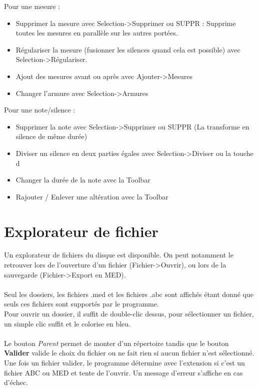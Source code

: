 \documentclass[12pt]{report}
\begin{document}
Pour une mesure : \\
\begin{itemize}
 \item Supprimer la mesure avec Selection->Supprimer ou SUPPR : Supprime toutes les mesures en parallèle sur les autres portées.\\
 \item Régulariser la mesure (fusionner les silences quand cela est possible) avec Selection->Régulariser.\\
 \item Ajout des mesures avant ou après avec Ajouter->Mesures\\
 \item Changer l'armure avec Selection->Armures\\
\end{itemize}
\vskip 0.2in
Pour une note/silence : \\
\begin{itemize}
 \item Supprimer la note avec Selection->Supprimer ou SUPPR (La transforme en silence de même durée)\\
 \item Diviser un silence en deux parties égales avec Selection->Diviser ou la touche d\\
 \item Changer la durée de la note avec la Toolbar\\
 \item Rajouter / Enlever une altération avec la Toolbar \\
\end{itemize}
\vskip 0.2in
\newpage
\section{Explorateur de fichier}
Un explorateur de fichiers du disque est disponible. On peut notamment le retrouver lors de l'ouverture d'un fichier (Fichier->Ouvrir), ou lors de la sauvegarde (Fichier->Export en MED).\\\\
Seul les dossiers, les fichiers .med et les fichiers .abc sont affichés étant donné que seuls ces fichiers sont supportés par le programme.\\
Pour ouvrir un dossier, il suffit de double-clic dessus, pour sélectionner un fichier, un simple clic suffit et le colorise en bleu.\\ \\
Le bouton \textit{Parent} permet de monter d'un répertoire tandis que le bouton \textbf{Valider} valide le choix du fichier ou ne fait rien si aucun fichier n'est sélectionné.\\
Une fois un fichier valider, le programme détermine avec l'extension si c'est un fichier ABC ou MED et tente de l'ouvrir. Un message d'erreur s'affiche en cas d'échec.\\
\end{document}
